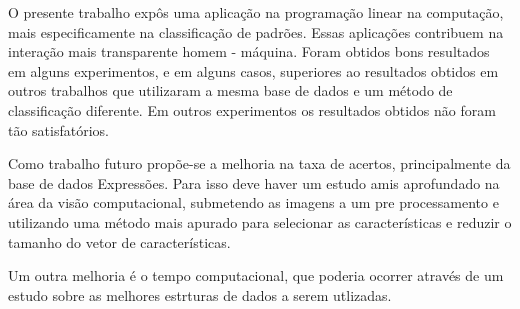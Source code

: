 O presente trabalho expôs uma aplicação na programação linear na computação, mais especificamente na classificação de padrões. Essas aplicações contribuem na interação mais transparente homem - máquina.
Foram obtidos bons resultados em alguns experimentos, e em alguns casos, superiores ao resultados obtidos em outros trabalhos que utilizaram a mesma base de dados e um método de classificação diferente. Em outros experimentos os resultados obtidos  não foram tão satisfatórios.

Como trabalho futuro propõe-se a melhoria na taxa de acertos, principalmente da base de dados Expressões. Para isso deve haver um estudo amis aprofundado na área da visão computacional, submetendo as imagens a um pre processamento e utilizando uma método mais apurado para selecionar as características e reduzir o tamanho do vetor de características.

Um outra melhoria é o tempo computacional, que poderia ocorrer através de um estudo sobre as melhores estrturas de dados a serem utlizadas.   
